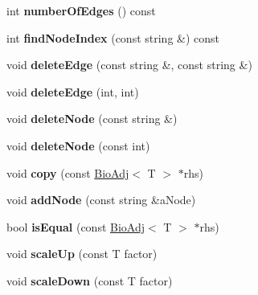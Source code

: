 \begin{DoxyCompactItemize}
\mbox{\label{class_bio_adj_mat_a0ec8c429ca05313fb0b7050276135e13}} 
int {\bfseries number\+Of\+Edges} () const
\item 
\mbox{\label{class_bio_adj_mat_a2313c6435a77c3f84472fd8dfab681b6}} 
int {\bfseries find\+Node\+Index} (const string \&) const
\item 
\mbox{\label{class_bio_adj_mat_a831ea24ad56b4ac76faa74c543c2bb41}} 
void {\bfseries delete\+Edge} (const string \&, const string \&)
\item 
\mbox{\label{class_bio_adj_mat_a509ea8d9d3dc8ac4adfc9fc5fbac0caf}} 
void {\bfseries delete\+Edge} (int, int)
\item 
\mbox{\label{class_bio_adj_mat_ab47d33fad99a1b01719ba921b3e0d2c2}} 
void {\bfseries delete\+Node} (const string \&)
\item 
\mbox{\label{class_bio_adj_mat_ac3097de7d71ceee083f0766a16108e7e}} 
void {\bfseries delete\+Node} (const int)
\item 
\mbox{\label{class_bio_adj_mat_a5c118726596cfd38c4f19418045e4a58}} 
void {\bfseries copy} (const \hyperlink{class_bio_adj}{Bio\+Adj}$<$ T $>$ $\ast$rhs)
\item 
\mbox{\label{class_bio_adj_mat_a3174456f467f1cf0d2e69acba53e6eeb}} 
void {\bfseries add\+Node} (const string \&a\+Node)
\item 
\mbox{\label{class_bio_adj_mat_ab552949b392e69942dac7d5fd30d7151}} 
bool {\bfseries is\+Equal} (const \hyperlink{class_bio_adj}{Bio\+Adj}$<$ T $>$ $\ast$rhs)
\item 
\mbox{\label{class_bio_adj_mat_aaf35a2b53f4bc823a21aa2fba1c18452}} 
void {\bfseries scale\+Up} (const T factor)
\item 
\mbox{\label{class_bio_adj_mat_adb6d26f896638b79171c5af99145f5d4}} 
void {\bfseries scale\+Down} (const T factor)
\end{DoxyCompactItemize}
